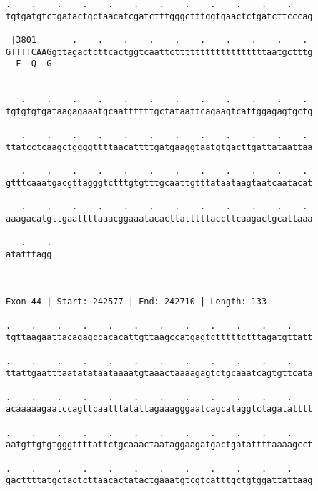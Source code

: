 \documentclass{article}
\begin{document}
\begin{Verbatim}
.    .    .    .    .    .    .    .    .    .    .    .    
tgtgatgtctgatactgctaacatcgatctttgggctttggtgaactctgatcttcccag
                                                            
 |3801       .    .    .    .    .    .    .    .    .    . 
GTTTTCAAGgttagactcttcactggtcaattcttttttttttttttttttaatgctttg
  F  Q  G                                                   
                                                            
  
   .    .    .    .    .    .    .    .    .    .    .    . 
tgtgtgtgataagagaaatgcaattttttgctataattcagaagtcattggagagtgctg
                                                            
   .    .    .    .    .    .    .    .    .    .    .    . 
ttatcctcaagctggggttttaacattttgatgaaggtaatgtgacttgattataattaa
                                                            
   .    .    .    .    .    .    .    .    .    .    .    . 
gtttcaaatgacgttagggtctttgtgtttgcaattgtttataataagtaatcaatacat
                                                            
   .    .    .    .    .    .    .    .    .    .    .    . 
aaagacatgttgaattttaaacggaaatacacttatttttaccttcaagactgcattaaa
                                                            
   .    .
atatttagg
         
         
 
Exon 44 | Start: 242577 | End: 242710 | Length: 133
 
.    .    .    .    .    .    .    .    .    .    .    .    
tgttaagaattacagagccacacattgttaagccatgagtctttttctttagatgttatt
                                                            
.    .    .    .    .    .    .    .    .    .    .    .    
ttattgaatttaatatataataaaatgtaaactaaaagagtctgcaaatcagtgttcata
                                                            
.    .    .    .    .    .    .    .    .    .    .    .    
acaaaaagaatccagttcaatttatattagaaagggaatcagcataggtctagatatttt
                                                            
.    .    .    .    .    .    .    .    .    .    .    .    
aatgttgtgtgggttttattctgcaaactaataggaagatgactgatattttaaaagcct
                                                            
.    .    .    .    .    .    .    .    .    .    .    .    
gacttttatgctactcttaacactatactgaaatgtcgtcatttgctgtggattattaag
                                                            

\end{Verbatim}
\end{document}
